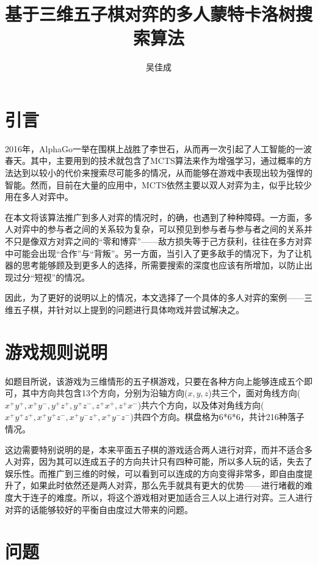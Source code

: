 \documentclass[9pt,twocolumn,twoside]{osajnl}
\title{基于三维五子棋对弈的多人蒙特卡洛树搜索算法}
\author[1]{吴佳成}
\affil[1]{南开大学，软件学院，软件工程专业，三班，1412649}
\begin{document}
\maketitle

\section{引言}

2016年，AlphaGo\cite{AlphaGo}一举在围棋上战胜了李世石，从而再一次引起了人工智能的一波春天。其中，主要用到的技术就包含了MCTS算法来作为增强学习，通过概率的方法达到以较小的代价来搜索尽可能多的情况，从而能够在游戏中表现出较为强悍的智能。然而，目前在大量的应用中，MCTS依然主要以双人对弈为主，似乎比较少用在多人对弈中。

在本文将该算法推广到多人对弈的情况时，的确，也遇到了种种障碍。一方面，多人对弈中的参与者之间的关系较为复杂，可以预见到参与者与参与者之间的关系并不只是像双方对弈之间的“零和博弈”——敌方损失等于己方获利，往往在多方对弈中可能会出现“合作”与“背叛”。另一方面，当引入了更多敌手的情况下，为了让机器的思考能够顾及到更多人的选择，所需要搜索的深度也应该有所增加，以防止出现过分“短视”的情况。

因此，为了更好的说明以上的情况，本文选择了一个具体的多人对弈的案例——三维五子棋，并针对以上提到的问题进行具体吻戏并尝试解决之。

\section{游戏规则说明}

如题目所说，该游戏为三维情形的五子棋游戏，只要在各种方向上能够连成五个即可，其中方向共包含13个方向，分别为沿轴方向($x,y,z$)共三个，面对角线方向($x^+y^+,x^+y^-,y^+z^+,y^+z^-,z^+x^+,z^+x^-$)共六个方向，以及体对角线方向($x^+y^+z^+,x^+y^+z^-,x^+y^-z^+,x^+y^-z^-$)共四个方向。棋盘格为6*6*6，共计216种落子情况。

这边需要特别说明的是，本来平面五子棋的游戏适合两人进行对弈，而并不适合多人对弈，因为其可以连成五子的方向共计只有四种可能，所以多人玩的话，失去了娱乐性。而推广到三维的时候，可以看到可以连成的方向变得非常多，即自由度提升了，如果此时依然还是两人对弈，那么先手就具有更大的优势——进行堵截的难度大于连子的难度。所以，将这个游戏相对更加适合三人以上进行对弈。三人进行对弈的话能够较好的平衡自由度过大带来的问题。

\section{问题}
\end{document}
